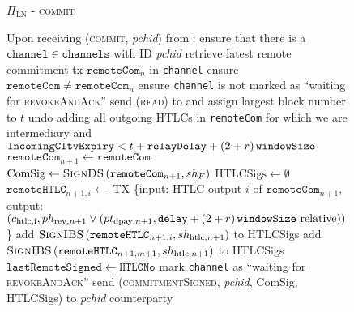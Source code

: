   \begin{figure}[H]
    \begin{protocolbox}{$\Pi_{\mathrm{LN}}$ - \textsc{commit}}
      \begin{algorithmic}[1]
        \State Upon receiving (\textsc{commit}, \textit{pchid}) from
        \environment:
        \Indent
          \State ensure that there is a $\mathtt{channel} \in \mathtt{channels}$
          with ID \textit{pchid}
          \State retrieve latest remote commitment tx $\mathtt{remoteCom}_n$ in
          \texttt{channel}
          \State ensure $\mathtt{remoteCom} \neq \mathtt{remoteCom}_n$
          \State ensure \texttt{channel} is not marked as ``waiting for
          \textsc{revokeAndAck}''
          \label{alg:protocol:pay:commit:nomark}
          \State send (\textsc{read}) to \ledger{} and assign largest block
          number to $t$
          \State undo adding all outgoing HTLCs in \texttt{remoteCom} for which
          we are intermediary and $\mathtt{IncomingCltvExpiry} < t +
          \mathtt{relayDelay} + \left(2 + r\right)\texttt{windowSize}$
          \State $\mathtt{remoteCom}_{n+1} \gets \mathtt{remoteCom}$
          \State $\mathrm{ComSig} \gets
          \textsc{SignDS}\left(\mathtt{remoteCom}_{n+1}, sh_F\right)$
          \State $\mathrm{HTLCSigs} \gets \emptyset$
            \State $\mathtt{remoteHTLC}_{n+1, i} \gets$ TX \{input: HTLC output
            $i$ of $\mathtt{remoteCom}_{n+1}$, output: $\left(c_{\mathrm{htlc,
            i}}, ph_{\mathrm{rev}, n+1} \vee \left(pt_{\mathrm{dpay}, n+1},
            \mathtt{delay} + \left(2 + r\right)\texttt{windowSize}{} \text{ relative}\right)\right)$\}
            \State add $\textsc{SignIBS}\left(\mathtt{remoteHTLC}_{n+1, i},
            sh_{\mathrm{htlc}, n+1}\right)$ to HTLCSigs
          \EndFor
          \State add $\textsc{SignIBS}\left(\mathtt{remoteHTLC}_{n+1, m+1},
          sh_{\mathrm{htlc}, n+1}\right)$ to HTLCSigs
          \State $\mathtt{lastRemoteSigned} \gets \mathtt{HTLCNo}$
          \State mark \texttt{channel} as ``waiting for \textsc{revokeAndAck}''
          \label{alg:protocol:pay:commit:mark}
          \State send (\textsc{commitmentSigned}, \textit{pchid}, ComSig,
          HTLCSigs) to \textit{pchid} counterparty
        \EndIndent
      \end{algorithmic}
    \end{protocolbox}
    \caption{}
    \label{alg:protocol:pay:commit}
  \end{figure}

